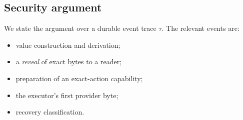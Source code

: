 \documentclass[letterpaper,twocolumn,10pt]{article}
\begin{document}
\subsection{Security argument}

We state the argument over a durable event trace $\tau$. The relevant
events are:
\begin{itemize}
\item value construction and derivation;
\item a \emph{reveal} of exact bytes to a reader;
\item preparation of an exact-action capability;
\item the executor's first provider byte;
\item recovery classification.
\end{itemize}
\end{document}
